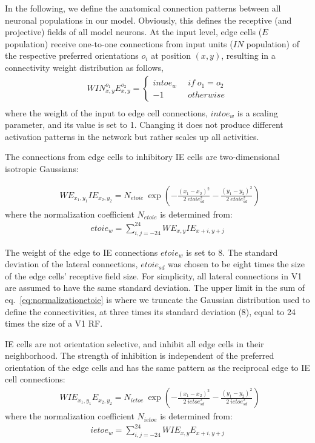 In the following, we define the anatomical connection patterns between
all neuronal populations in our model. Obviously, this defines the
receptive (and projective) fields of all model neurons. At the input
level, edge cells ($E$ population)  receive 
one-to-one
connections from input units
($IN$ population) of the respective preferred
orientations $o_i$ at 
position $(x,y)$,
resulting in
a connectivity weight distribution as follows,
\begin{align}
	WIN^{o_1}_{x,y}E^{o_2}_{x,y}=
	\begin{cases}
	intoe_w \:\;&if\;o_1 = o_2\\\nonumber
	-1\;&otherwise
	\end{cases}\\
\end{align}
where the weight of the input to edge cell connections, $intoe_w$ is a
scaling parameter, and its value is set to 1.  Changing it does not
produce different activation patterns in the network but rather scales
up all activities.

The connections from edge cells 
to inhibitory IE cells are two-dimensional isotropic Gaussians: 

\begin{align}
	&WE_{x_1,y_1}IE_{x_2,y_2}=N_{etoie}\: \exp\left(-\frac{(x_1-x_2)^2}{2\: etoie_{sd}^2}-\frac{(y_1-y_2)^2}{2\: etoie_{sd}^2}\right)\
\end{align}
where the normalization coefficient $N_{etoie}$ is determined from:
\begin{align}
	etoie_w = \sum^{24}_{i,j=-24} WE_{x,y}IE_{x+i,y+j}
\label{eq:normalizationetoie}
\end{align}

The weight of the edge to IE connections $etoie_w$ is set to 8. The standard deviation of the lateral connections,
$etoie_{sd}$ was chosen to be eight times the size of the edge cells'
receptive field size. For simplicity, all lateral connections in V1
are assumed to have the same standard deviation.
The upper limit in the sum of eq.~\ref{eq:normalizationetoie} is where
we truncate the Gaussian distribution used to define the
connectivities, at three times its standard deviation (8), equal to 24
times the size of a V1 RF.

IE cells are not orientation selective, and inhibit all edge cells in
their neighborhood. The strength of inhibition is independent of
the preferred orientation of the edge cells and has the same
pattern as the reciprocal edge to IE cell connections: 
\begin{align}
	&WIE_{x_1,y_1}E_{x_2,y_2}=N_{ietoe}\: \exp\left(-\frac{(x_1-x_2)^2}{2\: ietoe_{sd}^2}-\frac{(y_1-y_2)^2}{2\: ietoe_{sd}^2}\right)\
\end{align}
where the normalization coefficient $N_{ietoe}$ is determined from:
\begin{align}
	ietoe_w = \sum^{24}_{i,j=-24} WIE_{x,y}E_{x+i,y+j}
\end{align}

